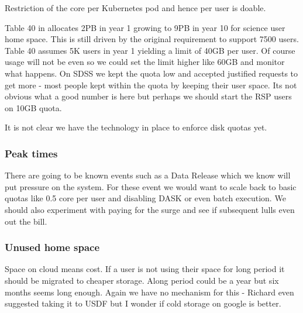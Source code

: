 Restriction of the core per Kubernetes pod and hence per user is doable.



Table 40 in  allocates 2PB in year 1 growing to 9PB in year 10 for science user home space.
This is still driven by the original requirement to support 7500 users. Table 40 assumes 5K users in year 1
yielding a limit of 40GB per user. Of course usage will not be even so we could set the limit higher like 60GB
and monitor what happens. On SDSS we kept the quota low and accepted justified requests to get more - most people kept within the quota by keeping their user space. Its not obvious what a good number is here but perhaps we should start the RSP users on 10GB quota.


It is not clear we have the technology in place to enforce disk quotas yet.

\subsubsection{Peak times}
There are going to be known events such as a Data Release which we know will put pressure on the system.
For these event we would want to scale back to basic quotas like 0.5 core per user  and disabling DASK or even batch execution.
We should also experiment with paying for the surge and see if subsequent lulls even out the bill.

\subsubsection{Unused home space}
Space on cloud means cost.
If a  user is not using their space for long period it should be migrated to cheaper storage.
Along period could be  a year but six months seems long enough.
Again we have no mechanism for this - Richard even suggested taking it to USDF but I wonder if cold storage on google is better.


